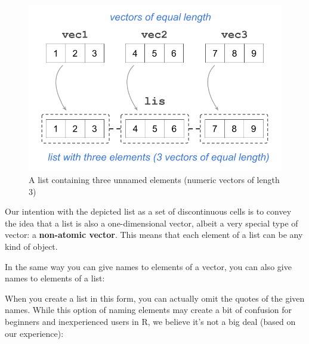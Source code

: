 \documentclass[
]{book}
\newenvironment{Shaded}{\begin{snugshade}}{\end{snugshade}}
\newcommand{\CommentTok}[1]{\textcolor[rgb]{0.56,0.35,0.01}{\textit{#1}}}
\newcommand{\FunctionTok}[1]{\textcolor[rgb]{0.00,0.00,0.00}{#1}}
\newcommand{\NormalTok}[1]{#1}
\newcommand{\OtherTok}[1]{\textcolor[rgb]{0.56,0.35,0.01}{#1}}
\newcommand{\StringTok}[1]{\textcolor[rgb]{0.31,0.60,0.02}{#1}}
\begin{document}
\begin{figure}

{\centering \includegraphics[width=0.6\linewidth]{images/objects/obj-list-vectors1} 

}

\caption{A list containing three unnamed elements (numeric vectors of length 3)}\label{fig:unnamed-chunk-118}
\end{figure}

Our intention with the depicted list as a set of discontinuous cells is to
convey the idea that a list is also a one-dimensional vector, albeit a very
special type of vector: a \textbf{non-atomic vector}. This means that each element
of a list can be any kind of object.

In the same way you can give names to elements of a vector, you can also give
names to elements of a list:

\begin{Shaded}
\end{Shaded}

When you create a list in this form, you can actually omit the quotes of
the given names. While this option of naming elements may create a bit of
confusion for beginners and inexperienced users in R, we believe it's not a big
deal (based on our experience):
\end{document}
